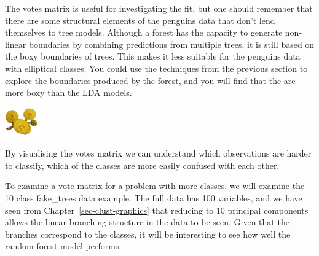 \documentclass[
  letterpaper,
]{krantz}
\newenvironment{Shaded}{\begin{snugshade}}{\end{snugshade}}
\newcommand{\AttributeTok}[1]{\textcolor[rgb]{0.40,0.45,0.13}{#1}}
\newcommand{\ConstantTok}[1]{\textcolor[rgb]{0.56,0.35,0.01}{#1}}
\newcommand{\DecValTok}[1]{\textcolor[rgb]{0.68,0.00,0.00}{#1}}
\newcommand{\FunctionTok}[1]{\textcolor[rgb]{0.28,0.35,0.67}{#1}}
\newcommand{\NormalTok}[1]{\textcolor[rgb]{0.00,0.23,0.31}{#1}}
\newcommand{\OtherTok}[1]{\textcolor[rgb]{0.00,0.23,0.31}{#1}}
\newcommand{\SpecialCharTok}[1]{\textcolor[rgb]{0.37,0.37,0.37}{#1}}
\newcommand{\infobox}[1]{%
\noindent\colorbox{info!30}{%
\begin{minipage}{0.98\linewidth}%
    \centering%
    \begin{minipage}[c]{0.15\linewidth} %
      \includegraphics[width=1.5cm]{images/mulga-flowers2.png} %
    \end{minipage}%
    \hfill %
    \begin{minipage}[c]{0.8\linewidth} %
      \bigskip%
      \textsf{#1}%
      \bigskip%
    \end{minipage}%
    \hspace*{3mm}%
  \end{minipage}%
}%
}
\begin{document}
The votes matrix is useful for investigating the fit, but one should
remember that there are some structural elements of the penguins data
that don't lend themselves to tree models. Although a forest has the
capacity to generate non-linear boundaries by combining predictions from
multiple trees, it is still based on the boxy boundaries of trees. This
makes it less suitable for the penguins data with elliptical classes.
You could use the techniques from the previous section to explore the
boundaries produced by the forest, and you will find that the are more
boxy than the LDA models. 

\infobox{By visualising the votes matrix we can understand which observations are harder to classify, which of the classes are more easily confused with each other.}

To examine a vote matrix for a problem with more classes, we will
examine the 10 class fake\_trees data example. The full data has 100
variables, and we have seen from Chapter~\ref{sec-clust-graphics} that
reducing to 10 principal components allows the linear branching
structure in the data to be seen. Given that the branches correspond to
the classes, it will be interesting to see how well the random forest
model performs.

\begin{Shaded}
\end{Shaded}
\end{document}
